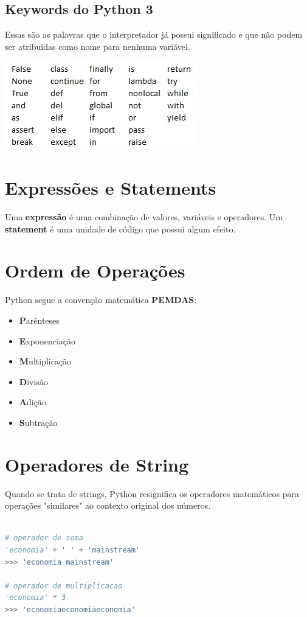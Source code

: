 \documentclass[a4paper,11pt]{book}
\begin{document}
\subsection{Keywords do Python 3}
Essas são as palavras que o interpretador já possui significado e que não podem ser atribuídas como nome para nenhuma variável.

\includegraphics[scale=1]{images/keywords_python.png}

\section{Expressões e Statements}
Uma \textbf{expressão} é uma combinação de valores, variáveis e operadores. Um \textbf{statement} é uma unidade de código que possui algum efeito.

\section{Ordem de Operações}
Python segue a convenção matemática \textbf{PEMDAS}:
\begin{itemize}
	\item \textbf{P}arênteses
	\item \textbf{E}xponenciação
	\item \textbf{M}ultiplicação
	\item \textbf{D}ivisão
	\item \textbf{A}dição
	\item \textbf{S}ubtração
\end{itemize}

\section{Operadores de String}
Quando se trata de strings, Python resignifica os operadores matemáticos para operações "similares" ao contexto original dos números.
\begin{lstlisting}[language=Python, caption=Operadores com strings]

# operador de soma
'economia' + ' ' + 'mainstream'
>>> 'economia mainstream'

# operador de multiplicacao
'economia' * 3
>>> 'economiaeconomiaeconomia'

\end{lstlisting}
\end{document}
